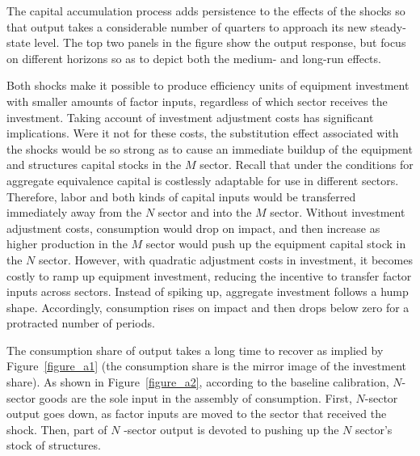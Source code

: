 \documentclass[12pt,fleqn]{article}
\begin{document}
{\normalsize
%
}

{\normalsize The capital accumulation process adds persistence to the
effects of the shocks so that output takes a considerable number of quarters
to approach its new steady-state level. The top two panels in the figure
show the output response, but focus on different horizons so as to depict
both the medium- and long-run effects. }

{\normalsize Both shocks make it possible to produce efficiency units of
equipment investment with smaller amounts of factor inputs, regardless of
which sector receives the investment. Taking account of investment
adjustment costs has significant implications. Were it not for these costs,
the substitution effect associated with the shocks would be so strong as to
cause an immediate buildup of the equipment and structures capital stocks in
the $M$ sector. Recall that under the conditions for aggregate equivalence
capital is costlessly adaptable for use in different sectors. Therefore,
labor and both kinds of capital inputs would be transferred immediately away
from the $N$ sector and into the $M$ sector. Without investment adjustment
costs, consumption would drop on impact, and then increase as higher
production in the $M$ sector would push up the equipment capital stock in
the $N$ sector. However, with quadratic adjustment costs in investment, it
becomes costly to ramp up equipment investment, reducing the incentive to
transfer factor inputs across sectors. Instead of spiking up, aggregate
investment follows a hump shape. Accordingly, consumption rises on impact and then drops below zero for a protracted number of periods.}

{\normalsize The consumption share of output takes a long time to recover as
implied by Figure~\ref{figure_a1} (the consumption share is the mirror image
of the investment share). As shown in Figure~\ref{figure_a2}, according to
the baseline calibration, $N$-sector goods are the sole input in the
assembly of consumption. First, $N$-sector output goes down, as factor
inputs are moved to the sector that received the shock. Then, part of $N$%
-sector output is devoted to pushing up the $N$ sector's stock of
structures.  }
\end{document}
